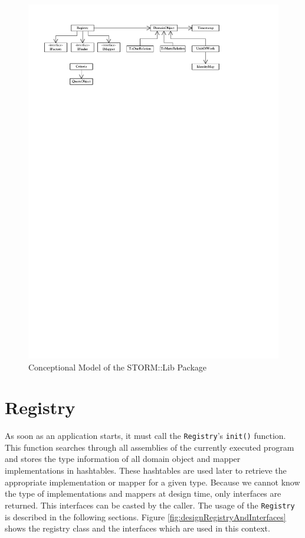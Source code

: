 		\begin{figure}
			\begin{center}
			\thispagestyle{plain}
				\includegraphics{./files/inc/figures/DesignLibConcept}
				\caption{\label{fig:designLibConcept} Conceptional Model of the STORM::Lib Package}
			\end{center}
		\end{figure}

				
	\section{Registry}
		As soon as an application starts, it must call the \verb~Registry~'s \verb~init()~ function.
		This function searches through all assemblies of the currently executed program and stores
		the type information of all domain object and mapper implementations in hashtables. These
		hashtables are used later to retrieve the appropriate implementation or mapper for a given
		type. Because we cannot know the type of implementations and mappers at design time, only
		interfaces are returned. This interfaces can be casted by the caller.
		The usage of the \verb~Registry~ is described in the following sections. Figure 
		\ref{fig:designRegistryAndInterfaces}	shows the registry class and the interfaces which are used
		in this context.
		
